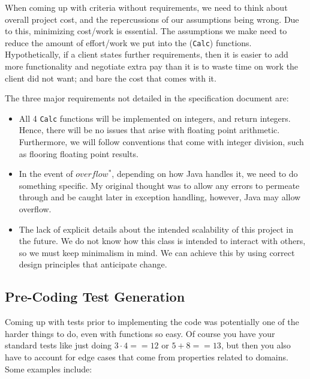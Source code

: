 \documentclass{article}
\begin{document}
\medskip

When coming up with criteria without requirements, we need to think
about overall project cost, and the repercussions of our assumptions
being wrong. Due to this, minimizing cost/work is essential. The
assumptions we make need to reduce the amount of effort/work we put
into the (\texttt{Calc}) functions. Hypothetically, if a client states
further requirements, then it is easier to add more functionality
and negotiate extra pay than it is to waste time on work the client
did not want; and bare the cost that comes with it.

\medskip

The three major requirements not detailed in the specification
document are:

\begin{itemize}
    \item All 4 \texttt{Calc} functions will be implemented on
        integers, and return integers. Hence, there will be no issues
        that arise with floating point arithmetic. Furthermore, we
        will follow conventions that come with integer division, such
        as flooring floating point results.
    \item In the event of $overflow^{*}$, depending on how Java handles
        it, we need to do something specific. My original thought was
        to allow any errors to permeate through and be caught later in
        exception handling, however, Java may allow overflow.
    \item The lack of explicit details about the intended scalability
        of this project in the future. We do not know how this class
        is intended to interact with others, so we must keep
        minimalism in mind. We can achieve this by using correct
        design principles that anticipate change.
\end{itemize}

\subsection{Pre-Coding Test Generation}

Coming up with tests prior to implementing the code was potentially
one of the harder things to do, even with functions so easy. Of course
you have your standard tests like just doing
\textit{$3 \cdot 4 == 12$} or \textit{$5 + 8 == 13$}, but then you
also have to account for edge cases that come from properties related
to domains. Some examples include:
\end{document}
